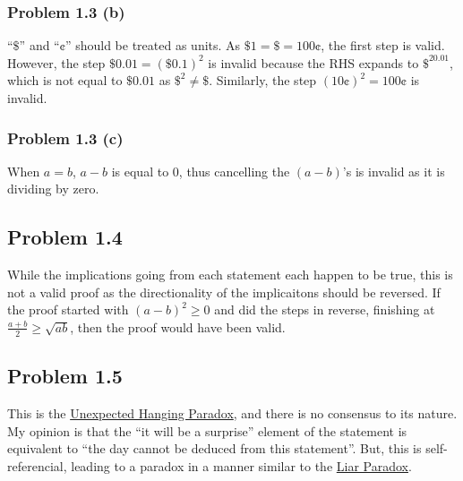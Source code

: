 \documentclass{article}
\begin{document}
\subsubsection{Problem 1.3 (b)}
``$\$$'' and ``¢'' should be treated as units. As $\$1=\$=100\text{¢}$, the first step is valid. However, the step $\$0.01 = (\$0.1)^2$ is invalid because the RHS expands to $\$^20.01$, which is not equal to $\$0.01$ as $\$^2\ne\$$. Similarly, the step $(10\text{¢})^2 = 100\text{¢}$ is invalid.
\subsubsection{Problem 1.3 (c)}
When $a=b$, $a-b$ is equal to $0$, thus cancelling the $(a-b)$'s is invalid as it is dividing by zero.
\subsection{Problem 1.4}
While the implications going from each statement each happen to be true, this is not a valid proof as the directionality of the implicaitons should be reversed. If the proof started with $(a-b)^2 \ge 0$ and did the steps in reverse, finishing at $\frac{a+b}{2} \ge \sqrt{ab}$, then the proof would have been valid.
\subsection{Problem 1.5}
This is the \href{https://en.wikipedia.org/wiki/Unexpected_hanging_paradox}{Unexpected Hanging Paradox}, and there is no consensus to its nature. My opinion is that the ``it will be a surprise'' element of the statement is equivalent to ``the day cannot be deduced from this statement''. But, this is self-referencial, leading to a paradox in a manner similar to the \href{https://en.wikipedia.org/wiki/Liar_paradox}{Liar Paradox}.
\end{document}
